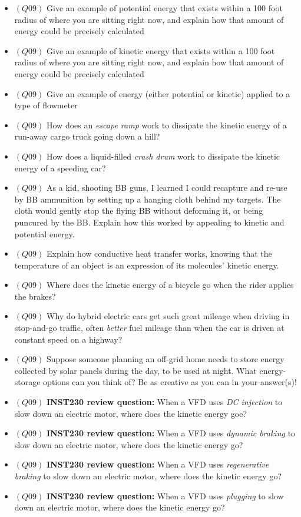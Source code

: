 \begin{itemize}
\begin{itemize}
\begin{itemize}
\begin{itemize}
\item{$(Q09)$} Give an example of potential energy that exists within a 100 foot radius of where you are sitting right now, and explain how that amount of energy could be precisely calculated
\item{$(Q09)$} Give an example of kinetic energy that exists within a 100 foot radius of where you are sitting right now, and explain how that amount of energy could be precisely calculated
\item{$(Q09)$} Give an example of energy (either potential or kinetic) applied to a type of flowmeter
\item{$(Q09)$} How does an {\it escape ramp} work to dissipate the kinetic energy of a run-away cargo truck going down a hill?
\item{$(Q09)$} How does a liquid-filled {\it crash drum} work to dissipate the kinetic energy of a speeding car?
\item{$(Q09)$} As a kid, shooting BB guns, I learned I could recapture and re-use by BB ammunition by setting up a hanging cloth behind my targets.  The cloth would gently stop the flying BB without deforming it, or being puncured by the BB.  Explain how this worked by appealing to kinetic and potential energy.
\item{$(Q09)$} Explain how conductive heat transfer works, knowing that the temperature of an object is an expression of its molecules' kinetic energy.
\item{$(Q09)$} Where does the kinetic energy of a bicycle go when the rider applies the brakes?
\item{$(Q09)$} Why do hybrid electric cars get such great mileage when driving in stop-and-go traffic, often {\it better} fuel mileage than when the car is driven at constant speed on a highway?
\item{$(Q09)$} Suppose someone planning an off-grid home needs to store energy collected by solar panels during the day, to be used at night.  What energy-storage options can you think of?  Be as creative as you can in your answer(s)!
\item{$(Q09)$} {\bf INST230 review question:} When a VFD uses {\it DC injection} to slow down an electric motor, where does the kinetic energy goe?
\item{$(Q09)$} {\bf INST230 review question:} When a VFD uses {\it dynamic braking} to slow down an electric motor, where does the kinetic energy go?
\item{$(Q09)$} {\bf INST230 review question:} When a VFD uses {\it regenerative braking} to slow down an electric motor, where does the kinetic energy go?
\item{$(Q09)$} {\bf INST230 review question:} When a VFD uses {\it plugging} to slow down an electric motor, where does the kinetic energy go?
\medskip



\end{itemize}
\end{itemize}
\end{itemize}
\end{itemize}
